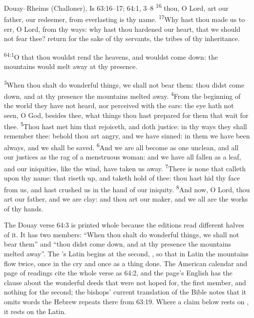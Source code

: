 \begin{englishwitness}{Douay--Rheims (Challoner), Is 63:16--17; 64:1, 3--8}
\textsuperscript{16} thou, O Lord, art our father,
our redeemer, from everlasting is thy name. \textsuperscript{17}Why hast thou
made us to err, O Lord, from thy ways: why hast thou hardened our heart, that
we should not fear thee? return for the sake of thy servants, the tribes of
thy inheritance.


\textsuperscript{64:1}O that thou wouldst rend the heavens, and wouldst come
down: the mountains would melt away at thy presence.

\textsuperscript{3}When thou shalt do wonderful things, we shall not bear
them: thou didst come down, and at thy presence the mountains melted away.
\textsuperscript{4}From the beginning of the world they have not heard, nor
perceived with the ears: the eye hath not seen, O God, besides thee, what
things thou hast prepared for them that wait for thee. \textsuperscript{5}Thou
hast met him that rejoiceth, and doth justice: in thy ways they shall remember
thee: behold thou art angry, and we have sinned: in them we have been always,
and we shall be saved. \textsuperscript{6}And we are all become as one
unclean, and all our justices as the rag of a menstruous woman: and we have
all fallen as a leaf, and our iniquities, like the wind, have taken us away.
\textsuperscript{7}There is none that calleth upon thy name: that riseth up,
and taketh hold of thee: thou hast hid thy face from us, and hast crushed us
in the hand of our iniquity. \textsuperscript{8}And now, O Lord, thou art our
father, and we are clay: and thou art our maker, and we all are the works of
thy hands.
\end{englishwitness}

\noindent The Douay verse 64:3 is printed whole because the editions read
different halves of it. It has two members: ``When thou shalt do wonderful
things, we shall not bear them'' and ``thou didst come down, and at thy
presence the mountains melted away''. The 's Latin begins at the
second, , so that in
Latin the mountains flow twice, once in the cry and once as a thing done. The
American calendar and page of readings cite the whole verse as 64:2, and the
page's English has
the clause about the wonderful deeds that were not hoped for, the first
member, and nothing for the second; the bishops' current translation of the
Bible notes that it omits words the Hebrew repeats there from 63:19. Where a
claim below rests on , it rests on the Latin.

